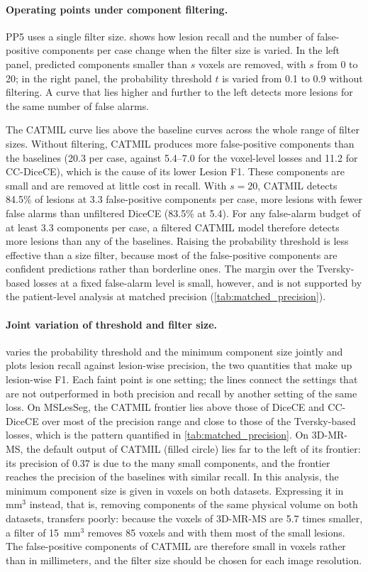 \paragraph{Operating points under component filtering.}
PP5 uses a single filter size.  shows how lesion
recall and the number of false-positive components per case change when
the filter size is varied. In the left panel, predicted components smaller
than $s$ voxels are removed, with $s$ from 0 to 20; in the right panel, the
probability threshold $t$ is varied from 0.1 to 0.9 without filtering. A
curve that lies higher and further to the left detects more lesions for
the same number of false alarms.

The CATMIL curve lies above the baseline curves across the whole range of
filter sizes. Without filtering, CATMIL produces more false-positive
components than the baselines (20.3 per case, against 5.4--7.0 for the
voxel-level losses and 11.2 for CC-DiceCE), which is the cause of its lower
Lesion F1. These components are small and are
removed at little cost in recall. With $s = 20$, CATMIL detects 84.5\% of
lesions at 3.3 false-positive components per case, more lesions with fewer
false alarms than unfiltered DiceCE (83.5\% at 5.4). For any false-alarm
budget of at least 3.3 components per case, a filtered CATMIL model
therefore detects more lesions than any of the baselines. Raising the
probability threshold is less effective than a size filter, because most
of the false-positive components are confident predictions rather than
borderline ones. The margin over the Tversky-based losses at a fixed
false-alarm level is small, however, and is not supported by the
patient-level analysis at matched precision (\cref{tab:matched_precision}).

\paragraph{Joint variation of threshold and filter size.}
 varies the probability threshold and the minimum
component size jointly and plots lesion recall against lesion-wise
precision, the two quantities that make up lesion-wise F1. Each faint point
is one setting; the lines connect the settings that are not outperformed
in both precision and recall by another setting of the same loss. On
MSLesSeg, the CATMIL frontier lies above those of DiceCE and CC-DiceCE over
most of the precision range and close to those of the Tversky-based losses,
which is the pattern quantified in \cref{tab:matched_precision}. On 3D-MR-MS, the
default output of CATMIL (filled circle) lies far to the left of its
frontier: its precision of 0.37 is due to the many small components, and
the frontier reaches the precision of the baselines with similar recall.
In this analysis, the minimum component size is given in voxels on both
datasets. Expressing it in mm$^3$ instead, that is, removing components of
the same physical volume on both datasets, transfers poorly: because the
voxels of 3D-MR-MS are 5.7 times smaller, a filter of 15~mm$^3$ removes
85 voxels and with them most of the small lesions. The false-positive
components of CATMIL are therefore small in voxels rather than in
millimeters, and the filter size should be chosen for each image
resolution.

